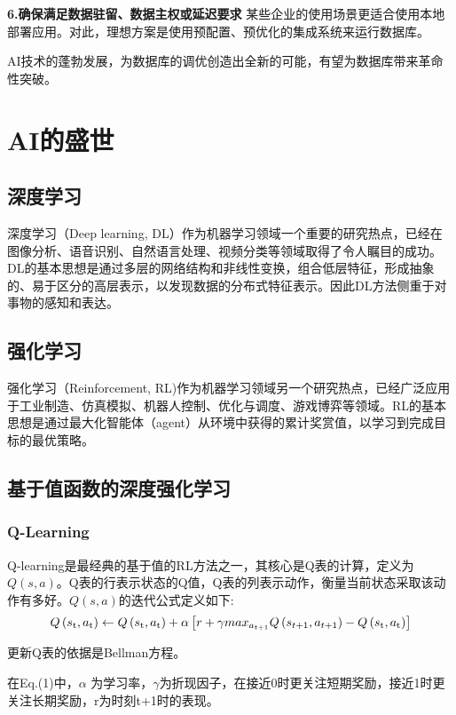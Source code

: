 \documentclass[a4paper,12pt]{article}
\begin{document}
\textbf{6.确保满足数据驻留、数据主权或延迟要求} 某些企业的使用场景更适合使用本地部署应用。对此，理想方案是使用预配置、预优化的集成系统来运行数据库\cite{03}。

AI技术的蓬勃发展，为数据库的调优创造出全新的可能，有望为数据库带来革命性突破。

\section{AI的盛世}
\subsection{深度学习}
深度学习（Deep learning, DL）作为机器学习领域一个重要的研究热点，已经在图像分析、语音识别、自然语言处理、视频分类等领域取得了令人瞩目的成功。DL的基本思想是通过多层的网络结构和非线性变换，组合低层特征，形成抽象的、易于区分的高层表示，以发现数据的分布式特征表示。因此DL方法侧重于对事物的感知和表达\cite{04}。

\subsection{强化学习}
强化学习（Reinforcement, RL)作为机器学习领域另一个研究热点，已经广泛应用于工业制造、仿真模拟、机器人控制、优化与调度、游戏博弈等领域。RL的基本思想是通过最大化智能体（agent）从环境中获得的累计奖赏值，以学习到完成目标的最优策略\cite{04}。

\subsection{基于值函数的深度强化学习}

\subsubsection{Q-Learning}
Q-learning是最经典的基于值的RL方法之一，其核心是Q表的计算，定义为 $Q(s, a)$。Q表的行表示状态的Q值，Q表的列表示动作，衡量当前状态采取该动作有多好。$Q(s, a)$的迭代公式定义如下:
\begin{equation}
Q\left( {s_{\rm{t}},a_{\rm{t}}} \right) \leftarrow Q\left( {s_{\rm{t}},a_{\rm{t}}} \right) + \alpha \left[ {r{\rm{ }} + \gamma max_{a_{t + 1}}Q\left( {s_{t+1},a_{t+1}} \right) - Q\left( {s_{\rm{t}},a_{\rm{t}}} \right)} \right]
\end{equation}

更新Q表的依据是Bellman方程。

在Eq.(1)中，$ \alpha $ 为学习率，$\gamma$为折现因子，在接近0时更关注短期奖励，接近1时更关注长期奖励，r为时刻t+1时的表现\cite{03}。
\end{document}
